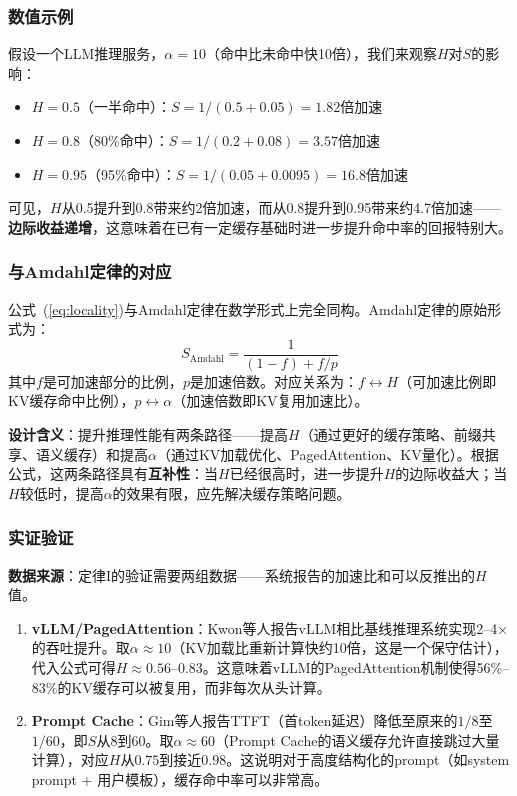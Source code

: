 \subsubsection{数值示例}

假设一个LLM推理服务，$\alpha = 10$（命中比未命中快10倍），我们来观察$H$对$S$的影响：

\begin{itemize}[nosep]
\item $H = 0.5$（一半命中）：$S = 1/(0.5 + 0.05) = 1.82$倍加速
\item $H = 0.8$（80\%命中）：$S = 1/(0.2 + 0.08) = 3.57$倍加速
\item $H = 0.95$（95\%命中）：$S = 1/(0.05 + 0.0095) = 16.8$倍加速
\end{itemize}

可见，$H$从0.5提升到0.8带来约2倍加速，而从0.8提升到0.95带来约4.7倍加速——\textbf{边际收益递增}，这意味着在已有一定缓存基础时进一步提升命中率的回报特别大。

\subsubsection{与Amdahl定律的对应}

公式~(\ref{eq:locality})与Amdahl定律在数学形式上完全同构。Amdahl定律的原始形式为：
\begin{equation}
S_{\mathrm{Amdahl}} = \frac{1}{(1-f) + f/p}
\end{equation}
其中$f$是可加速部分的比例，$p$是加速倍数。对应关系为：$f \leftrightarrow H$（可加速比例即KV缓存命中比例），$p \leftrightarrow \alpha$（加速倍数即KV复用加速比）。

\textbf{设计含义}：提升推理性能有两条路径——提高$H$（通过更好的缓存策略、前缀共享、语义缓存\cite{gim2024promptcache}）和提高$\alpha$（通过KV加载优化、PagedAttention\cite{kwon2023pagedattention}、KV量化\cite{hooper2024kvquant}）。根据公式，这两条路径具有\textbf{互补性}：当$H$已经很高时，进一步提升$H$的边际收益大；当$H$较低时，提高$\alpha$的效果有限，应先解决缓存策略问题。

\subsubsection{实证验证}

\textbf{数据来源}：定律I的验证需要两组数据——系统报告的加速比和可以反推出的$H$值。

\begin{enumerate}[nosep]
\item \textbf{vLLM/PagedAttention}：Kwon等人报告vLLM相比基线推理系统实现2--4$\times$的吞吐提升\cite{kwon2023pagedattention}。取$\alpha \approx 10$（KV加载比重新计算快约10倍，这是一个保守估计），代入公式可得$H \approx 0.56$--$0.83$。这意味着vLLM的PagedAttention机制使得56\%--83\%的KV缓存可以被复用，而非每次从头计算。

\item \textbf{Prompt Cache}：Gim等人报告TTFT（首token延迟）降低至原来的$1/8$至$1/60$\cite{gim2024promptcache}，即$S$从8到60。取$\alpha \approx 60$（Prompt Cache的语义缓存允许直接跳过大量计算），对应$H$从$0.75$到接近$0.98$。这说明对于高度结构化的prompt（如system prompt + 用户模板），缓存命中率可以非常高。
\end{enumerate}

